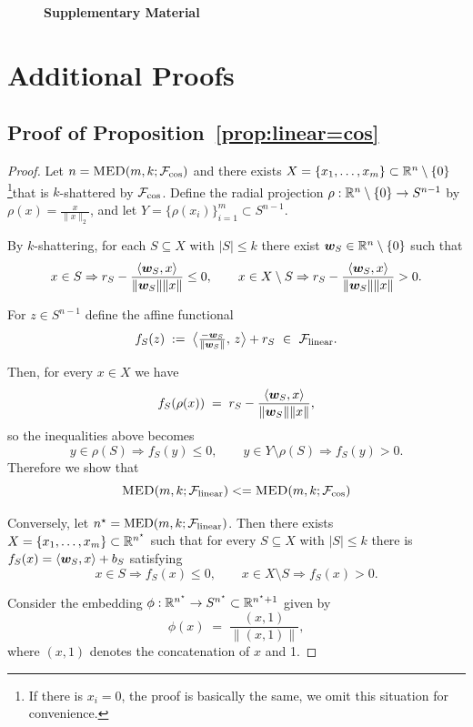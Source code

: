 \clearpage
\begin{figure}[t!]
\huge
\begin{center}
    \textbf{Supplementary Material}
\end{center}
\end{figure}

\section{Additional Proofs}

\subsection{Proof of Proposition~\ref{prop:linear=cos}}\label{app:proof:prop:linear=cos}


\begin{proof}
Let $n=\textsc{MED}(m, k; \mathcal{F}_{\cos})$ and there exists $X=\{x_1,\dots,x_m\}\subset\mathbb{R}^{n}\setminus\{0\}$ \footnote{If there is $x_i = 0$, the proof is basically the same, we omit this situation for convenience.}that is $k$-shattered by $\mathcal{F}_{\cos}$.
Define the radial projection $\rho:\mathbb{R}^{n}\setminus\{0\}\to S^{n-1}$ by $\rho(x)=\frac{x}{\|x\|_2}$, and let
$Y=\{\rho(x_i)\}_{i=1}^m\subset S^{n-1}$.

By $k$-shattering, for each $S\subseteq X$ with $|S|\le k$ there exist $\bm{w}_S\in\mathbb{R}^{n}\setminus\{0\}$ such that
\[
x\in S \Rightarrow r_S-\frac{\langle \bm{w}_S,x\rangle}{\|\bm{w}_S\|\|x\|} \le 0,
\qquad
x\in X\setminus S \Rightarrow r_S-\frac{\langle \bm{w}_S,x\rangle}{\|\bm{w}_S\|\|x\|} > 0.
\]

For $z\in S^{n-1}$ define the affine functional
\[
f_S(z)\;:=\;\big\langle \tfrac{-\bm{w}_S}{\|\bm{w}_S\|},\, z \big\rangle + r_S
\ \in\ \mathcal{F}_{\rm linear}.
\]

Then, for every $x\in X$ we have
\[
f_S(\rho(x)) \;=\; r_S-\frac{\langle \bm{w}_S,x\rangle}{\|\bm{w}_S\|\|x\|},
\]
so the inequalities above becomes
\[
y\in \rho(S)\Rightarrow f_S(y)\le 0,\qquad y\in Y\setminus \rho(S)\Rightarrow f_S(y)>0.
\]
Therefore we show that 
\[
\textsc{MED}(m, k; \mathcal{F}_{\rm linear}) <= \textsc{MED}(m, k; \mathcal{F}_{\cos})
\]

Conversely, let $n^\star=\mathrm{MED}(m,k;\mathcal{F}_{\rm linear})$. Then there exists $X=\{x_1,\dots,x_m\}\subset\mathbb{R}^{n^\star}$ such that for every $S\subseteq X$ with $|S|\le k$ there is $f_S(x)=\langle \bm{w}_S,x\rangle+b_S$ satisfying
\[
x\in S \Rightarrow f_S(x)\le 0,\qquad x\in X\setminus S \Rightarrow f_S(x)>0.
\]

Consider the embedding $\phi:\mathbb{R}^{n^\star}\to S^{n^\star}\subset\mathbb{R}^{n^\star+1}$ given by
\[
\phi(x)\;=\;\frac{(x,1)}{\|(x,1)\|},
\]
where $(x,1)$ denotes the concatenation of $x$ and 1.


\end{proof}
